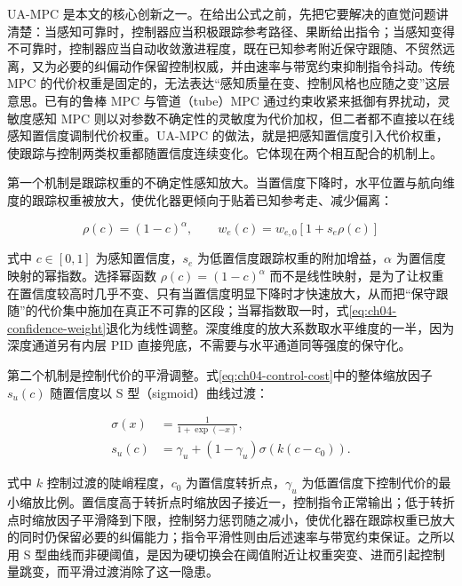 UA-MPC 是本文的核心创新之一。在给出公式之前，先把它要解决的直觉问题讲清楚：当感知可靠时，控制器应当积极跟踪参考路径、果断给出指令；当感知变得不可靠时，控制器应当自动收敛激进程度，既在已知参考附近保守跟随、不贸然远离，又为必要的纠偏动作保留控制权威，并由速率与带宽约束抑制指令抖动。传统 MPC 的代价权重是固定的，无法表达``感知质量在变、控制风格也应随之变''这层意思。已有的鲁棒 MPC 与管道（tube）MPC 通过约束收紧来抵御有界扰动\cite{mayne2005robust,jimoh2024tube}，灵敏度感知 MPC 则以对参数不确定性的灵敏度为代价加权\cite{belvedere2025sensitivity}，但二者都不直接以在线感知置信度调制代价权重。UA-MPC 的做法，就是把感知置信度引入代价权重，使跟踪与控制两类权重都随置信度连续变化。它体现在两个相互配合的机制上。

第一个机制是跟踪权重的不确定性感知放大。当置信度下降时，水平位置与航向维度的跟踪权重被放大，使优化器更倾向于贴着已知参考走、减少偏离：

\begin{equation}
\rho(c)=(1-c)^\alpha,
\qquad
w_e(c)=w_{e,0}\left[1+s_e\rho(c)\right]
\label{eq:ch04-confidence-weight}
\end{equation}

式中 \(c\in[0,1]\) 为感知置信度，\(s_e\) 为低置信度跟踪权重的附加增益，\(\alpha\) 为置信度映射的幂指数。选择幂函数 \(\rho(c)=(1-c)^\alpha\) 而不是线性映射，是为了让权重在置信度较高时几乎不变、只有当置信度明显下降时才快速放大，从而把``保守跟随''的代价集中施加在真正不可靠的区段；当幂指数取一时，式\eqref{eq:ch04-confidence-weight}退化为线性调整。深度维度的放大系数取水平维度的一半，因为深度通道另有内层 PID 直接兜底，不需要与水平通道同等强度的保守化。

第二个机制是控制代价的平滑调整。式\eqref{eq:ch04-control-cost}中的整体缩放因子 \(s_u(c)\) 随置信度以 S 型（sigmoid）曲线过渡：

\begin{equation}
\begin{aligned}
\sigma(x)&=\frac{1}{1+\exp(-x)},\\
s_u(c)&=\gamma_u+(1-\gamma_u)\sigma\!\left(k(c-c_0)\right).
\end{aligned}
\label{eq:ch04-control-scale}
\end{equation}

式中 \(k\) 控制过渡的陡峭程度，\(c_0\) 为置信度转折点，\(\gamma_u\) 为低置信度下控制代价的最小缩放比例。置信度高于转折点时缩放因子接近一，控制指令正常输出；低于转折点时缩放因子平滑降到下限，控制努力惩罚随之减小，使优化器在跟踪权重已放大的同时仍保留必要的纠偏能力；指令平滑性则由后述速率与带宽约束保证。之所以用 S 型曲线而非硬阈值，是因为硬切换会在阈值附近让权重突变、进而引起控制量跳变，而平滑过渡消除了这一隐患。

